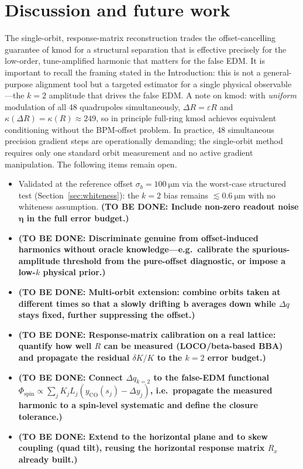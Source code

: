 \documentclass[preprint,12pt]{elsarticle}
\newcommand{\todo}[1]{{\color{red}\textbf{(TO BE DONE: #1)}}}
\begin{document}
\section{Discussion and future work}
\label{sec:future}

The single-orbit, response-matrix reconstruction trades the offset-cancelling
guarantee of kmod for a structural separation that is effective precisely
for the low-order, tune-amplified harmonic that matters for the false EDM.
It is important to recall the framing stated in the Introduction: this is
not a general-purpose alignment tool but a targeted estimator for a single
physical observable---the $k=2$ amplitude that drives the false EDM.
A note on kmod: with \emph{uniform} modulation of all 48 quadrupoles
simultaneously, $\Delta R=\varepsilon R$ and $\kappa(\Delta R)=\kappa(R)\approx249$,
so in principle full-ring kmod achieves equivalent conditioning without the
BPM-offset problem. In practice, 48 simultaneous precision gradient steps
are operationally demanding; the single-orbit method requires only one
standard orbit measurement and no active gradient manipulation.
The following items remain open.

\begin{itemize}
  \item Validated at the reference offset $\sigma_b=\SI{100}{\micro\meter}$
    via the worst-case structured test (Section~\ref{sec:whiteness}): the $k=2$ bias
    remains $\lesssim\SI{0.6}{\micro\meter}$ with no whiteness assumption.
    \todo{Include non-zero readout noise $\boldsymbol{\eta}$ in the full error budget.}
\item \todo{Discriminate genuine from offset-induced harmonics without
oracle knowledge---e.g.\ calibrate the spurious-amplitude threshold from
the pure-offset diagnostic, or impose a low-$k$ physical prior.}
\item \todo{Multi-orbit extension: combine orbits taken at different times
so that a slowly drifting $\mathbf{b}$ averages down while $\Delta q$ stays
fixed, further suppressing the offset.}
\item \todo{Response-matrix calibration on a real lattice: quantify how
well $R$ can be measured (LOCO/beta-based BBA) and propagate the residual
$\delta K/K$ to the $k=2$ error budget.}
\item \todo{Connect $\Delta q_{k=2}$ to the false-EDM functional
$\Phi_\mathrm{spin}\propto\sum_j K_jL_j(y_\mathrm{CO}(s_j)-\Delta y_j)$,
i.e.\ propagate the measured harmonic to a spin-level systematic and
define the closure tolerance.}
\item \todo{Extend to the horizontal plane and to skew coupling (quad
tilt), reusing the horizontal response matrix $R_x$ already built.}
\end{itemize}
\end{document}
